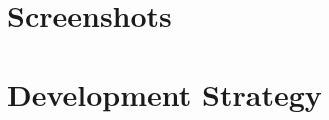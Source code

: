\documentclass{mproj}
\begin{document}

\chapter{Screenshots}





\chapter{Development Strategy}





\end{document}
